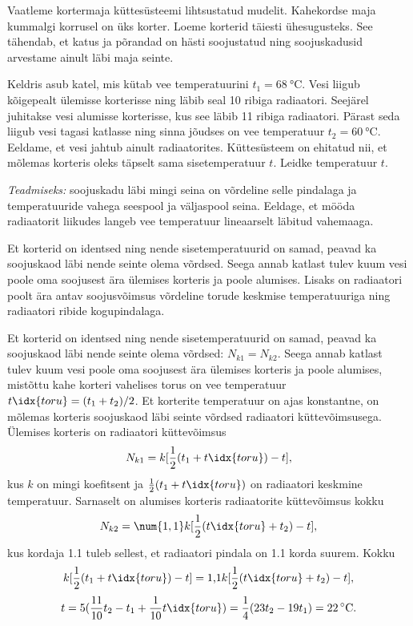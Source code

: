 
Vaatleme kortermaja küttesüsteemi lihtsustatud mudelit. Kahekordse maja kummalgi korrusel on üks korter. Loeme korterid täiesti ühesugusteks. See tähendab, et katus ja põrandad on hästi soojustatud ning soojuskadusid arvestame ainult läbi maja seinte. 

Keldris asub katel, mis kütab vee temperatuurini $t_1=\SI{68}{\degreeCelsius}$. Vesi liigub kõigepealt ülemisse korterisse ning läbib seal 10 ribiga radiaatori. Seejärel juhitakse vesi alumisse korterisse, kus see läbib 11 ribiga radiaatori. Pärast seda liigub vesi tagasi katlasse ning sinna jõudses on vee temperatuur $t_2=\SI{60}{\degreeCelsius}$. Eeldame, et vesi jahtub ainult radiaatorites. Küttesüsteem on ehitatud nii, et mõlemas korteris oleks täpselt sama sisetemperatuur $t$. Leidke temperatuur $t$. 

\emph{Teadmiseks:} soojuskadu läbi mingi seina on võrdeline selle pindalaga ja temperatuuride vahega seespool ja väljaspool seina. Eeldage, et mööda radiaatorit liikudes langeb vee temperatuur lineaarselt läbitud vahemaaga.

\hint
Et korterid on identsed ning nende sisetemperatuurid on samad, peavad ka soojuskaod läbi nende seinte olema võrdsed. Seega annab katlast tulev kuum vesi poole oma soojusest ära ülemises korteris ja poole alumises. Lisaks on radiaatori poolt ära antav soojusvõimsus võrdeline torude keskmise temperatuuriga ning radiaatori ribide kogupindalaga.

\solu
Et korterid on identsed ning nende sisetemperatuurid on samad, peavad ka soojuskaod läbi nende seinte olema võrdsed: $N_{k1}=N_{k2}$. Seega annab katlast tulev kuum vesi poole oma soojusest ära ülemises korteris ja poole alumises, mistõttu kahe korteri vahelises torus on vee temperatuur $t\idx{toru}=(t_1+t_2)/2$. Et korterite temperatuur on ajas konstantne, on mõlemas korteris soojuskaod läbi seinte võrdsed radiaatori küttevõimsusega. Ülemises korteris on radiaatori küttevõimsus
\[
N_{k1}=k[\frac{1}{2}(t_1+t\idx{toru})-t],
\]
kus $k$ on mingi koefitsent ja $\frac{1}{2}(t_1+t\idx{toru})$ on radiaatori keskmine temperatuur. Sarnaselt on alumises korteris radiaatorite küttevõimsus kokku
\[
N_{k2}=\num{1,1} k[\frac{1}{2}(t\idx{toru}+t_{2})-t],
\]
kus kordaja \num{1,1} tuleb sellest, et radiaatori pindala on \num{1,1} korda suurem. Kokku
\[ k[\frac{1}{2}(t_1+t\idx{toru})-t]=\text{1,1}k[\frac{1}{2}(t\idx{toru}+t_{2})-t], \]
\[ t=5 (\frac{11}{10}t_2-t_1+\frac{1}{10}t\idx{toru})=\frac{1}{4}(23t_2-19t_1)=22\,^{\circ}\mathrm{C}. \]


